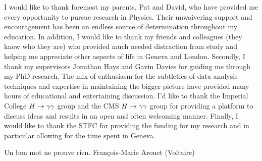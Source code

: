 \begin{acknowledgements}
  I would like to thank foremost my parents, Pat and David, who have provided me every opportunity to 
pursue research in Physics. Their unwaivering support and encouragement has been
an endless source of determination throughout my education. In addition, I would like to thank my friends and colleagues (they know who they are) who provided much needed distraction from study and helping me appreciate other aspects of life in Geneva and London.  
  Secondly, I thank my supervisors Jonathan Hays and Gavin Davies for guiding me through my PhD research.
The mix of enthusiasm for the subtleties of data analysis techniques and expertise in maintaining the 
bigger picture have provided many hours of educational and entertaining discussion.
  I'd like to thank the Imperial College $H\rightarrow\gamma\gamma$ group and the CMS $H\rightarrow\gamma\gamma$ group for providing a platform 
to discuss ideas and results in an open and often welcoming manner.  
  Finally, I would like to thank the STFC for providing the funding for my research and 
 in particular allowing for the time spent in Geneva.

\end{acknowledgements}



\tableofcontents

\listoffigures
\listoftables
\frontquote%
  {Un bon mot ne prouve rien.}%
  {Fran\c{c}ois-Marie Arouet (Voltaire)}
